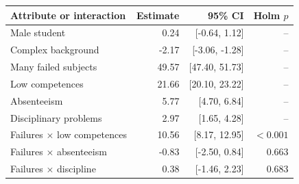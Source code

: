 \begin{tabular}{@{}p{6cm}rrr@{}}
\toprule
Attribute or interaction & Estimate & 95\% CI & Holm $p$ \\
\midrule
Male student & 0.24 & [-0.64, 1.12] & -- \\
Complex background & -2.17 & [-3.06, -1.28] & -- \\
Many failed subjects & 49.57 & [47.40, 51.73] & -- \\
Low competences & 21.66 & [20.10, 23.22] & -- \\
Absenteeism & 5.77 & [4.70, 6.84] & -- \\
Disciplinary problems & 2.97 & [1.65, 4.28] & -- \\
Failures $\times$ low competences & 10.56 & [8.17, 12.95] & $<0.001$ \\
Failures $\times$ absenteeism & -0.83 & [-2.50, 0.84] & 0.663 \\
Failures $\times$ discipline & 0.38 & [-1.46, 2.23] & 0.683 \\
\bottomrule
\end{tabular}
